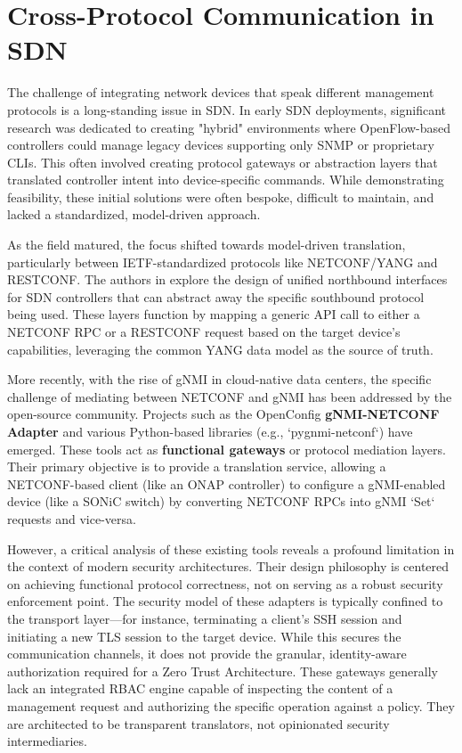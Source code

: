 \documentclass[12pt, a4paper, reqno, oneside]{book}
\begin{document}
\section{Cross-Protocol Communication in SDN}
\label{sec:related_cross_protocol}
The challenge of integrating network devices that speak different management protocols is a long-standing issue in SDN. In early SDN deployments, significant research was dedicated to creating "hybrid" environments where OpenFlow-based controllers could manage legacy devices supporting only SNMP or proprietary CLIs. This often involved creating protocol gateways or abstraction layers that translated controller intent into device-specific commands. While demonstrating feasibility, these initial solutions were often bespoke, difficult to maintain, and lacked a standardized, model-driven approach.


As the field matured, the focus shifted towards model-driven translation, particularly between IETF-standardized protocols like NETCONF/YANG and RESTCONF. The authors in \cite{Alghamdi2022} explore the design of unified northbound interfaces for SDN controllers that can abstract away the specific southbound protocol being used. These layers function by mapping a generic API call to either a NETCONF RPC or a RESTCONF request based on the target device's capabilities, leveraging the common YANG data model as the source of truth.

More recently, with the rise of gNMI in cloud-native data centers, the specific challenge of mediating between NETCONF and gNMI has been addressed by the open-source community. Projects such as the OpenConfig \textbf{gNMI-NETCONF Adapter} and various Python-based libraries (e.g., `pygnmi-netconf`) have emerged. These tools act as \textbf{functional gateways} or protocol mediation layers. Their primary objective is to provide a translation service, allowing a NETCONF-based client (like an ONAP controller) to configure a gNMI-enabled device (like a SONiC switch) by converting NETCONF RPCs into gNMI `Set` requests and vice-versa.


However, a critical analysis of these existing tools reveals a profound limitation in the context of modern security architectures. Their design philosophy is centered on achieving functional protocol correctness, not on serving as a robust security enforcement point. The security model of these adapters is typically confined to the transport layer—for instance, terminating a client's SSH session and initiating a new TLS session to the target device. While this secures the communication channels, it does not provide the granular, identity-aware authorization required for a Zero Trust Architecture. These gateways generally lack an integrated RBAC engine capable of inspecting the content of a management request and authorizing the specific operation against a policy. They are architected to be transparent translators, not opinionated security intermediaries.
\end{document}
